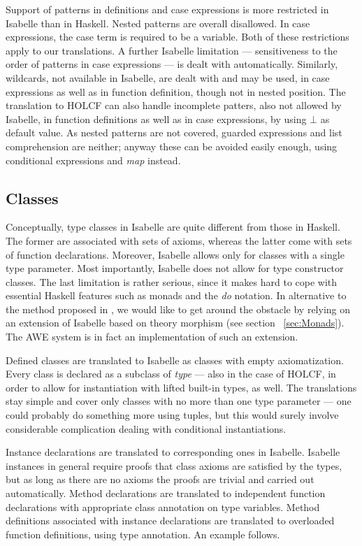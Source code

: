\documentclass{llncs}
\begin{document}
\noindent 
Support of patterns in definitions and case expressions is more restricted in
Isabelle than in Haskell. Nested patterns are overall disallowed. In case
expressions, the case term is required to be a variable. Both of these
restrictions apply to our translations. A further Isabelle limitation ---
sensitiveness to the order of patterns in case expressions --- is dealt with
automatically.  Similarly, wildcards, not available in Isabelle, are dealt
with and may be used, in case expressions as well as in function definition,
though not in nested position. The translation to HOLCF can also handle
incomplete patters, also not allowed by Isabelle, in function definitions as
well as in case expressions, by using $\bot$ as default value. As nested
patterns are not covered, guarded expressions and list comprehension are
neither; anyway these can be avoided easily enough, using conditional
expressions and \emph{map} instead.



\subsection{Classes}

Conceptually, type classes in Isabelle are quite different from those in
Haskell. The former are associated with sets of axioms, whereas the latter
come with sets of function declarations. Moreover, Isabelle allows only for
classes with a single type parameter.  Most importantly, Isabelle does not
allow for type constructor classes. The last limitation is rather serious,
since it makes hard to cope with essential Haskell features such as monads and
the \emph{do} notation.  In alternative to the method proposed in \cite{Huff},
we would like to get around the obstacle by relying on an extension of
Isabelle based on theory morphism (see section~ \ref{sec:Monads}). The AWE
system \cite{AWE} is in fact an implementation of such an extension.

Defined classes are translated to Isabelle as classes with empty
axiomatization. Every class is declared as a subclass of \emph{type} --- also
in the case of HOLCF, in order to allow for instantiation with lifted built-in
types, as well. The translations stay simple and cover only classes with no
more than one type parameter --- one could probably do something more using
tuples, but this would surely involve considerable complication dealing with
conditional instantiations.

Instance declarations are translated to corresponding ones in Isabelle.
Isabelle instances in general require proofs that class axioms are satisfied
by the types, but as long as there are no axioms the proofs are trivial and
carried out automatically. Method declarations are translated to independent
function declarations with appropriate class annotation on type variables.
Method definitions associated with instance declarations are translated to
overloaded function definitions, using type annotation. An example follows.
\\
\end{document}
